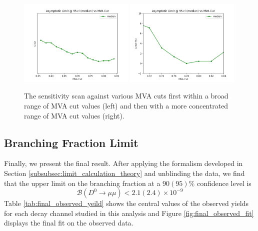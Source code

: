 \begin{figure}[h!]
    \begin{center}
      \includegraphics[width=0.49\textwidth]{figures/chapter4/results/limit_bdt_median.png}
      \includegraphics[width=0.49\textwidth]{figures/chapter4/results/limit_bdt_median_v2.png}\\
    \end{center}
    \caption{
      The sensitivity scan against various MVA cuts first within a broad range of MVA cut values (left) and then with a more concentrated range of MVA cut values (right).
    }
    \label{fig:sensitivity_scan}
\end{figure}

\subsection{Branching Fraction Limit}
\label{subsec:final_result}

Finally, we present the final result. After applying the formalism developed in Section \ref{subsubsec:limit_calculation_theory} and unblinding the data, we find that the upper limit on the branching fraction at a $90(95)\%$ confidence level is
\begin{equation}
    \mathcal{B}(D^0 \to \mu \mu) < 2.1(2.4) \times 10^{-9} 
\end{equation}
Table \ref{tab:final_observed_yeild} shows the central values of the observed yields for each decay channel studied in this analysis and Figure \ref{fig:final_observed_fit} displays the final fit on the observed data.

